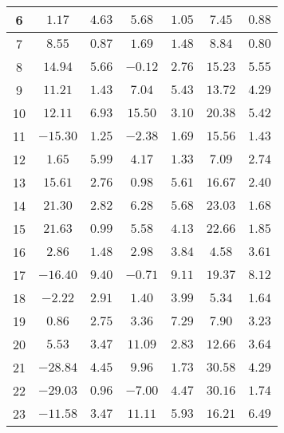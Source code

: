\begin{table}[H]
\begin{tabular}{|c|c|c|c|c|c|c|}
                        6   &    $1.17$    &  $4.63$  & $5.68$   &  $1.05$  & $7.45$   &  $0.88$  \\ \hline
                        7   &    $8.55$    &  $0.87$  & $1.69$   &  $1.48$  & $8.84$   &  $0.80$  \\ \hline
                        8   &    $14.94$   &  $5.66$  & $-0.12$  &  $2.76$  & $15.23$  &  $5.55$  \\ \hline
                        9   &    $11.21$   &  $1.43$  & $7.04$   &  $5.43$  & $13.72$  &  $4.29$  \\ \hline
                        10  &    $12.11$   &  $6.93$  & $15.50$  &  $3.10$  & $20.38$  &  $5.42$  \\ \hline
                        11  &    $-15.30$  &  $1.25$  & $-2.38$  &  $1.69$  & $15.56$  &  $1.43$  \\ \hline
                        12  &    $1.65$    &  $5.99$  & $4.17$   &  $1.33$  & $7.09$   &  $2.74$  \\ \hline
                        13  &    $15.61$   &  $2.76$  & $0.98$   &  $5.61$  & $16.67$  &  $2.40$  \\ \hline
                        14  &    $21.30$   &  $2.82$  & $6.28$   &  $5.68$  & $23.03$  &  $1.68$  \\ \hline
                        15  &    $21.63$   &  $0.99$  & $5.58$   &  $4.13$  & $22.66$  &  $1.85$  \\ \hline
                        16  &    $2.86$    &  $1.48$  & $2.98$   &  $3.84$  & $4.58$   &  $3.61$  \\ \hline
                        17  &    $-16.40$  &  $9.40$  & $-0.71$  &  $9.11$  & $19.37$  &  $8.12$  \\ \hline
                        18  &    $-2.22$   &  $2.91$  & $1.40$   &  $3.99$  & $5.34$   &  $1.64$  \\ \hline
                        19  &    $0.86$    &  $2.75$  & $3.36$   &  $7.29$  & $7.90$   &  $3.23$  \\ \hline
                        20  &    $5.53$    &  $3.47$  & $11.09$  &  $2.83$  & $12.66$  &  $3.64$  \\ \hline
                        21  &    $-28.84$  &  $4.45$  & $9.96$   &  $1.73$  & $30.58$  &  $4.29$  \\ \hline
                        22  &    $-29.03$  &  $0.96$  & $-7.00$  &  $4.47$  & $30.16$  &  $1.74$  \\ \hline
                        23  &    $-11.58$  &  $3.47$  & $11.11$  &  $5.93$  & $16.21$  &  $6.49$  \\ \hline

\end{tabular}
\end{table}
